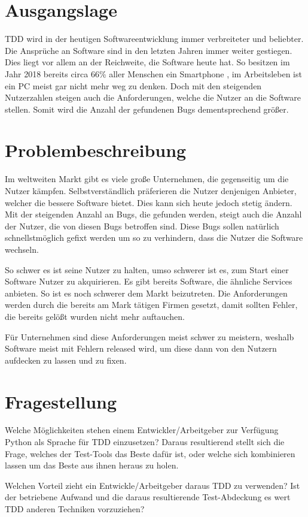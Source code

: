 \section{Ausgangslage}
TDD wird in der heutigen Softwareentwicklung immer verbreiteter und beliebter.
Die Ansprüche an Software sind in den letzten Jahren immer weiter gestiegen. Dies
liegt vor allem an der Reichweite, die Software heute hat. So besitzen im Jahr
2018 bereits circa 66\% aller Menschen ein Smartphone \cite{FraukeSchobelt:Smartphone},
im Arbeitsleben ist ein PC meist gar nicht mehr weg zu denken. Doch mit den steigenden
Nutzerzahlen steigen auch die Anforderungen, welche die Nutzer an die Software stellen.
Somit wird die Anzahl der gefundenen Bugs dementsprechend größer.

\section{Problembeschreibung}
Im weltweiten Markt gibt es viele große Unternehmen, die gegenseitig um die
Nutzer kämpfen. Selbstverständlich präferieren die Nutzer denjenigen Anbieter, welcher die bessere
Software bietet. Dies kann sich heute jedoch stetig ändern. Mit der steigenden Anzahl
an Bugs, die gefunden werden, steigt auch die Anzahl der Nutzer, die von diesen Bugs betroffen
sind. Diese Bugs sollen natürlich schnellstmöglich gefixt werden um so zu verhindern,
dass die Nutzer die Software wechseln.

So schwer es ist seine Nutzer zu halten, umso schwerer ist es, zum Start einer Software
Nutzer zu akquirieren. Es gibt bereits Software, die ähnliche Services anbieten.
So ist es noch schwerer dem Markt beizutreten. Die Anforderungen werden durch die
bereits am Mark tätigen Firmen gesetzt, damit sollten Fehler, die bereits gelößt
wurden nicht mehr auftauchen.

Für Unternehmen sind diese Anforderungen meist schwer zu meistern, weshalb Software
meist mit Fehlern released wird, um diese dann von den Nutzern aufdecken zu lassen und
zu fixen.

\section{Fragestellung}
Welche Möglichkeiten stehen einem Entwickler/Arbeitgeber zur Verfügung Python
als Sprache für TDD einzusetzen? Daraus resultierend stellt sich die Frage,
welches der Test-Tools das Beste dafür ist, oder welche sich kombinieren lassen
um das Beste aus ihnen heraus zu holen.

Welchen Vorteil zieht ein Entwickle/Arbeitgeber daraus TDD zu verwenden? Ist
der betriebene Aufwand und die daraus resultierende Test-Abdeckung es wert TDD
anderen Techniken vorzuziehen?
